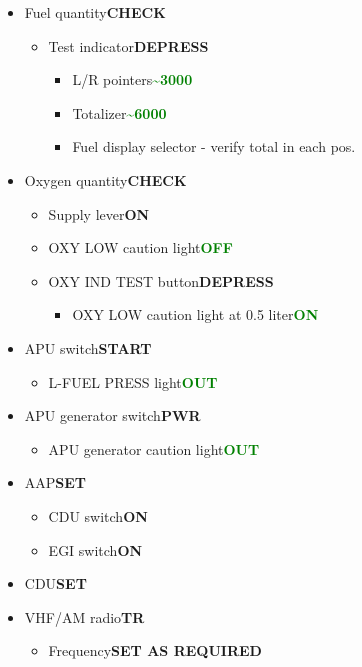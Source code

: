 \documentclass[a4paper,12pt,dvipsnames]{letter}
\newcommand{\button}[1]{\textbf{#1}}
\newcommand{\ok}[1]{\textcolor{Green}{\textbf{#1}}}
\begin{document}
{\begin{itemize}
 \item Fuel quantity\dotfill\button{CHECK}
 \begin{itemize}
  \item Test indicator\dotfill\button{DEPRESS}
  \begin{itemize}
   \item L/R pointers\dotfill\ok{\textasciitilde3000}
   \item Totalizer\dotfill\ok{\textasciitilde6000}
   \item Fuel display selector - verify total in each pos.
  \end{itemize}
 \end{itemize}
 \item Oxygen quantity\dotfill\button{CHECK}
 \begin{itemize}
  \item Supply lever\dotfill\button{ON}
  \item OXY LOW caution light\dotfill\ok{OFF}
  \item OXY IND TEST button\dotfill\button{DEPRESS}
  \begin{itemize}
   \item OXY LOW caution light at 0.5 liter\dotfill\ok{ON}
  \end{itemize}
 \end{itemize}
 \item APU switch\dotfill\button{START}
 \begin{itemize}
  \item L-FUEL PRESS light\dotfill\ok{OUT}
 \end{itemize}
 \item APU generator switch\dotfill\button{PWR}
 \begin{itemize}
  \item APU generator caution light\dotfill\ok{OUT}
 \end{itemize}
 \item AAP\dotfill\button{SET}
 \begin{itemize}
  \item CDU switch\dotfill\button{ON}
  \item EGI switch\dotfill\button{ON}
 \end{itemize}
 \item CDU\dotfill\button{SET}
 \item VHF/AM radio\dotfill\button{TR}
 \begin{itemize}
  \item Frequency\dotfill\button{SET AS REQUIRED}
 \end{itemize}

\end{itemize}}
\end{document}
